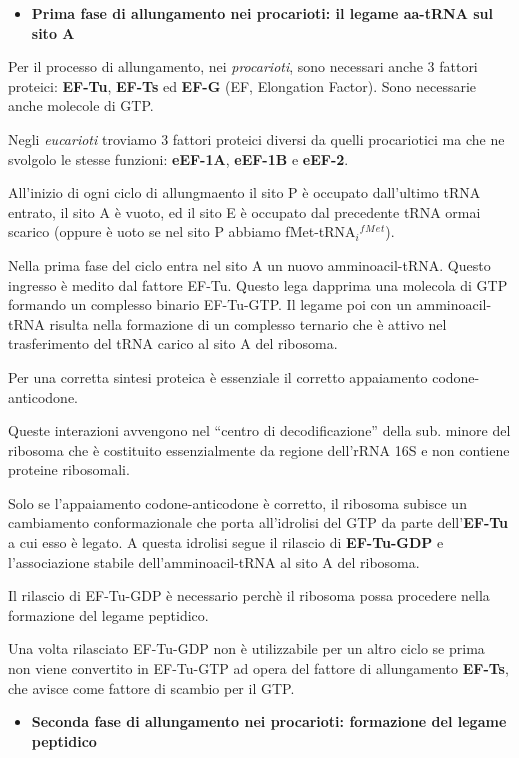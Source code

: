 \documentclass[11pt]{book}
\begin{document}
\begin{itemize}
\itemsep1pt\parskip0pt
\item
  \textbf{Prima fase di allungamento nei procarioti: il legame aa-tRNA
  sul sito A}
\end{itemize}

Per il processo di allungamento, nei \emph{procarioti}, sono necessari
anche 3 fattori proteici: \textbf{EF-Tu}, \textbf{EF-Ts} ed
\textbf{EF-G} (EF, Elongation Factor). Sono necessarie anche molecole di
GTP.

Negli \emph{eucarioti} troviamo 3 fattori proteici diversi da quelli
procariotici ma che ne svolgolo le stesse funzioni: \textbf{eEF-1A},
\textbf{eEF-1B} e \textbf{eEF-2}.

All'inizio di ogni ciclo di allungmaento il sito P è occupato
dall'ultimo tRNA entrato, il sito A è vuoto, ed il sito E è occupato dal
precedente tRNA ormai scarico (oppure è uoto se nel sito P abbiamo
fMet-tRNA\(_i\)\(^f\)\(^M\)\(^e\)\(^t\)).

Nella prima fase del ciclo entra nel sito A un nuovo amminoacil-tRNA.
Questo ingresso è medito dal fattore EF-Tu. Questo lega dapprima una
molecola di GTP formando un complesso binario EF-Tu-GTP. Il legame poi
con un amminoacil-tRNA risulta nella formazione di un complesso ternario
che è attivo nel trasferimento del tRNA carico al sito A del ribosoma.

Per una corretta sintesi proteica è essenziale il corretto appaiamento
codone-anticodone.

Queste interazioni avvengono nel ``centro di decodificazione'' della
sub. minore del ribosoma che è costituito essenzialmente da regione
dell'rRNA 16S e non contiene proteine ribosomali.

Solo se l'appaiamento codone-anticodone è corretto, il ribosoma subisce
un cambiamento conformazionale che porta all'idrolisi del GTP da parte
dell'\textbf{EF-Tu} a cui esso è legato. A questa idrolisi segue il
rilascio di \textbf{EF-Tu-GDP} e l'associazione stabile
dell'amminoacil-tRNA al sito A del ribosoma.

Il rilascio di EF-Tu-GDP è necessario perchè il ribosoma possa procedere
nella formazione del legame peptidico.

Una volta rilasciato EF-Tu-GDP non è utilizzabile per un altro ciclo se
prima non viene convertito in EF-Tu-GTP ad opera del fattore di
allungamento \textbf{EF-Ts}, che avisce come fattore di scambio per il
GTP.

\begin{itemize}
\itemsep1pt\parskip0pt
\item
  \textbf{Seconda fase di allungamento nei procarioti: formazione del
  legame peptidico}
\end{itemize}
\end{document}
